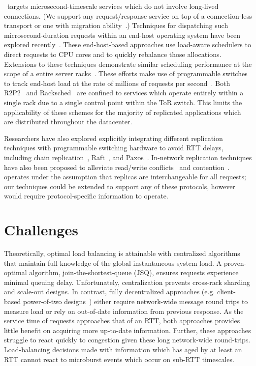 \daronpon\ targets microsecond-timescale services which
do not involve long-lived connections.
(We support any request/response service on top of a connection-less
transport or one with migration ability~\cite{crab,quic}.)  Techniques
for dispatching such microsecond-duration requests within an end-host
operating system have been explored recently~\cite{IX, shinjuku, snap,
  shenango, zygos}.  These end-host-based approaches use load-aware
schedulers to direct requests to CPU cores and to quickly rebalance
those allocations.  Extensions to these techniques demonstrate similar
scheduling performance at the scope of a entire server
racks~\cite{r2p2, racksched}. These efforts make use of programmable
switches to track end-host load at the rate of millions of requests
per second~\cite{tofino2}. Both R2P2~\cite{r2p2} and
Racksched~\cite{racksched} are confined to services which operate
entirely within a single rack due to a single control point within the
ToR switch. This limits the applicability of these schemes for the
majority of replicated applications which are distributed throughout
the datacenter.

Researchers have also explored explicitly integrating different
replication techniques with programmable switching hardware to avoid
RTT delays, including chain replication~\cite{netchain},
Raft~\cite{hovercraft}, and Paxos~\cite{nopaxos}.  In-network
replication techniques have also been proposed to alleviate
read/write conflicts~\cite{harmonia} and
contention~\cite{pegasus}. 
%
\daronpon operates under the assumption
that replicas are interchangeable for all requests; our
techniques could be extended to support any of these protocols, however
\daronpon would require protocol-specific information to operate.

\section{Challenges}
\label{daronpon:sec:challenges}

Theoretically, optimal load balancing is attainable with centralized
algorithms~\cite{jsq_fcfs} that maintain full knowledge of the global
instantaneous system load.  
%
A proven-optimal algorithm, join-the-shortest-queue (JSQ), ensures requests experience minimal queuing delay.  
%
Unfortunately, centralization prevents cross-rack sharding and scale-out designs.  
%
In contrast, fully decentralized approaches (e.g. client-based power-of-two designs~\cite{power_of_2}) either require network-wide message round trips to measure load or rely on out-of-date information from previous response.
%
As the service time of requests approaches that of an RTT, 
both approaches provides little benefit on acquiring more up-to-date information.
%
Further, these approaches struggle to react quickly to congestion given these long network-wide round-trips. 
%
Load-balancing decisions made with information which has aged by at least an RTT cannot react to microburst events which occur on sub-RTT timescales.

